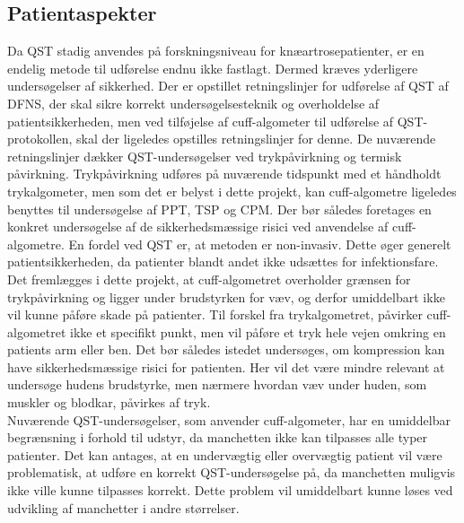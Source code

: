 \subsection{Patientaspekter} \label{Patient_aspekt} %
Da QST stadig anvendes på forskningsniveau for knæartrosepatienter, er en endelig metode til udførelse endnu ikke fastlagt. Dermed kræves yderligere undersøgelser af sikkerhed. Der er opstillet retningslinjer for udførelse af QST af DFNS, der skal sikre korrekt undersøgelsesteknik og overholdelse af patientsikkerheden, men ved tilføjelse af cuff-algometer til udførelse af QST-protokollen, skal der ligeledes opstilles retningslinjer for denne. De nuværende retningslinjer dækker QST-undersøgelser ved trykpåvirkning og termisk påvirkning. Trykpåvirkning udføres på nuværende tidspunkt med et håndholdt trykalgometer, men som det er belyst i dette projekt, kan cuff-algometre ligeledes benyttes til undersøgelse af PPT, TSP og CPM. Der bør således foretages en konkret undersøgelse af de sikkerhedsmæssige risici ved anvendelse af cuff-algometre. En fordel ved QST er, at metoden er non-invasiv. Dette øger generelt patientsikkerheden, da patienter blandt andet ikke udsættes for infektionsfare. \\
Det fremlægges i dette projekt, at cuff-algometret overholder grænsen for trykpåvirkning og ligger under brudstyrken for væv, og derfor umiddelbart ikke vil kunne påføre skade på patienter. Til forskel fra trykalgometret, påvirker cuff-algometret ikke et specifikt punkt, men vil påføre et tryk hele vejen omkring en patients arm eller ben. Det bør således istedet undersøges, om kompression kan have sikkerhedsmæssige risici for patienten. Her vil det være mindre relevant at undersøge hudens brudstyrke, men nærmere hvordan væv under huden, som muskler og blodkar, påvirkes af tryk. \\
Nuværende QST-undersøgelser, som anvender cuff-algometer, har en umiddelbar begrænsning i forhold til udstyr, da manchetten ikke kan tilpasses alle typer patienter. Det kan antages, at en undervægtig eller overvægtig patient vil være problematisk, at udføre en korrekt QST-undersøgelse på, da manchetten muligvis ikke ville kunne tilpasses korrekt. 
Dette problem vil umiddelbart kunne løses ved udvikling af manchetter i andre størrelser.


